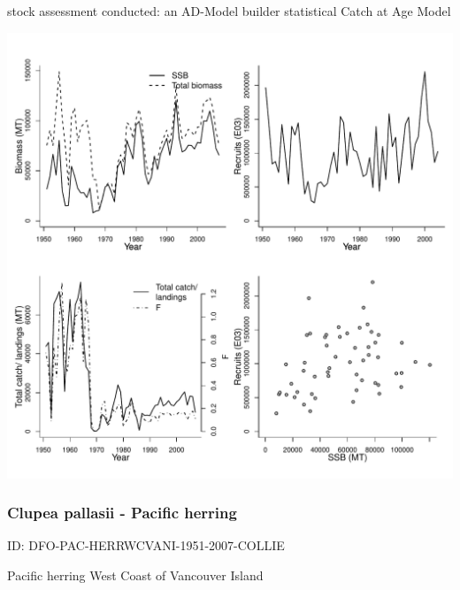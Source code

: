 stock assessment conducted: an AD-Model builder statistical Catch at Age Model 
\begin{center}
\vspace{-0.2cm}\includegraphics[scale=0.65]{../tex/figures/plot-DFO-PAC-HERRSOG-1951-2007-COLLIE.pdf}
\end{center}

\newpage
\subsubsection{Clupea pallasii - Pacific herring}
ID: DFO-PAC-HERRWCVANI-1951-2007-COLLIE

Pacific herring West Coast of Vancouver Island 

